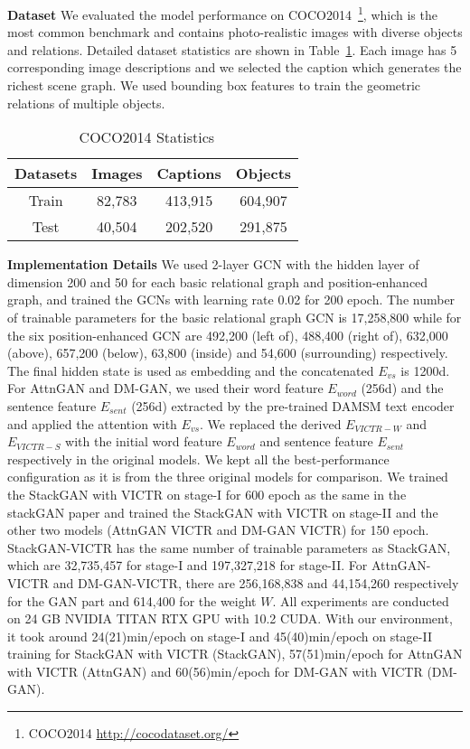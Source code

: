 \documentclass[11pt]{article}
\begin{document}
\noindent\textbf{Dataset}
We evaluated the model performance on COCO2014~\cite{lin2014microsoft}\footnote{COCO2014 \url{http://cocodataset.org/}}, which is the most common benchmark and contains photo-realistic images with diverse objects and relations. Detailed dataset statistics are shown in Table~\ref{tab:dataset_table}. Each image has 5 corresponding image descriptions and we selected the caption which generates the richest scene graph. We used bounding box features to train the geometric relations of multiple objects. 


\begin{table}[h]
    \centering
    \small
    \begin{tabular}{|c|c|c|c|}
    \hline \bf Datasets & \bf Images & \bf Captions & \bf Objects \\ \hline
    Train & 82,783 & 413,915 & 604,907  \\\hline
    Test &40,504 & 202,520 & 291,875 \\
    \hline
    \end{tabular}
    \caption{\label{tab:dataset_table} COCO2014 Statistics ~\cite{lin2014microsoft}}
\end{table}

\noindent \textbf{Implementation Details} We used 2-layer GCN with the hidden layer of dimension 200 and 50 for each basic relational graph and position-enhanced graph, and trained the GCNs with learning rate 0.02 for 200 epoch. The number of trainable parameters for the basic relational graph GCN is 17,258,800 while for the six position-enhanced GCN are 492,200 (left of), 488,400 (right of), 632,000 (above), 657,200 (below), 63,800 (inside) and 54,600 (surrounding) respectively. The final hidden state is used as embedding and the concatenated $E_{vs}$ is 1200d. For AttnGAN and DM-GAN, we used their word feature $E_{word}$ (256d) and the sentence feature $E_{sent}$ (256d) extracted by the pre-trained DAMSM text encoder and applied the attention with $E_{vs}$. We replaced the derived $E_{VICTR-W}$ and $E_{VICTR-S}$ with the initial word feature $E_{word}$ and sentence feature $E_{sent}$ respectively in the original models. We kept all the best-performance configuration as it is from the three original models for comparison. We trained the StackGAN with VICTR on stage-I for 600 epoch as the same in the stackGAN paper and trained the StackGAN with VICTR on stage-II and the other two models (AttnGAN VICTR and DM-GAN VICTR) for 150 epoch. StackGAN-VICTR has the same number of trainable parameters as StackGAN, which are 32,735,457 for stage-I and 197,327,218 for stage-II. For AttnGAN-VICTR and DM-GAN-VICTR, there are 256,168,838 and 44,154,260 respectively for the GAN part and 614,400 for the weight $W$. All experiments are conducted on 24 GB NVIDIA TITAN RTX GPU with 10.2 CUDA. With our environment, it took around 24(21)min/epoch on stage-I and 45(40)min/epoch on stage-II training for StackGAN with VICTR (StackGAN), 57(51)min/epoch for AttnGAN with VICTR (AttnGAN) and 60(56)min/epoch for DM-GAN with VICTR (DM-GAN).
\end{document}

